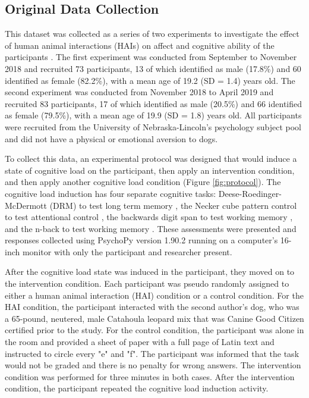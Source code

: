 \documentclass[12pt]{iopart}
\begin{document}
\subsection*{Original Data Collection}
This dataset was collected as a series of two experiments to investigate the effect of human animal interactions (HAIs) on affect and cognitive ability of the participants \cite{thayer2022effects}.  The first experiment was conducted from September to November 2018 and recruited 73 participants, 13 of which identified as male (17.8\%) and 60 identified as female (82.2\%), with a mean age of 19.2 (SD = 1.4) years old.  The second experiment was conducted from November 2018 to April 2019 and recruited 83 participants, 17 of which identified as male (20.5\%) and 66 identified as female (79.5\%), with a mean age of 19.9 (SD = 1.8) years old.  All participants were recruited from the University of Nebraska-Lincoln's psychology subject pool and did not have a physical or emotional aversion to dogs.  

To collect this data, an experimental protocol was designed that would induce a state of cognitive load on the participant, then apply an intervention condition, and then apply another cognitive load condition (Figure \ref{fig:protocol}).  The cognitive load induction has four separate cognitive tasks: Deese-Roedinger-McDermott (DRM) to test long term memory \cite{roediger1995creating, mcevoy1999connection}, the Necker cube pattern control to test attentional control \cite{orbach1963reversibility, cimprich1993development, sahlin2016influence}, the backwards digit span to test working memory \cite{berman2008cognitive}, and the n-back to test working memory \cite{rich2007effects, cohen1994activation}.  These assessments were presented and responses collected using PsychoPy version 1.90.2 \cite{peirce2019psychopy2} running on a computer's 16-inch monitor with only the participant and researcher present.  

After the cognitive load state was induced in the participant, they moved on to the intervention condition.  Each participant was pseudo randomly assigned to either a human animal interaction (HAI) condition or a control condition.  For the HAI condition, the participant interacted with the second author's dog, who was a 65-pound, neutered, male Catahoula leopard mix that was Canine Good Citizen certified prior to the study.  For the control condition, the participant was alone in the room and provided a sheet of paper with a full page of Latin text and instructed to circle every "e" and "f".  The participant was informed that the task would not be graded and there is no penalty for wrong answers.  The intervention condition was performed for three minutes in both cases.  After the intervention condition, the participant repeated the cognitive load induction activity.
\end{document}
